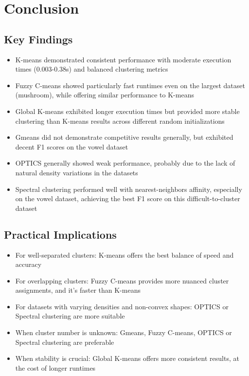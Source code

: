 \section{Conclusion}
\label{sec:conclusion}

\subsection{Key Findings}

\begin{itemize}
    \item K-means demonstrated consistent performance with moderate execution times (0.003-0.38s) and balanced clustering metrics
    \item Fuzzy C-means showed particularly fast runtimes even on the largest dataset (mushroom), while offering similar performance to K-means
    \item Global K-means exhibited longer execution times but provided more stable clustering than K-means results across different random initializations
    \item Gmeans did not demonstrate competitive results generally, but exhibited decent F1 scores on the vowel dataset
    \item OPTICS generally showed weak performance, probably due to the lack of natural density variations in the datasets
    \item Spectral clustering performed well with nearest-neighbors affinity, especially on the vowel dataset, achieving the best F1 score on this difficult-to-cluster dataset
\end{itemize}

\subsection{Practical Implications}

\begin{itemize}
    \item For well-separated clusters: K-means offers the best balance of speed and accuracy
    \item For overlapping clusters: Fuzzy C-means provides more nuanced cluster assignments, and it's faster than K-means
    \item For datasets with varying densities and non-convex shapes: OPTICS or Spectral clustering are more suitable
    \item When cluster number is unknown: Gmeans, Fuzzy C-means, OPTICS or Spectral clustering are preferable
    \item When stability is crucial: Global K-means offers more consistent results, at the cost of longer runtimes
\end{itemize}


